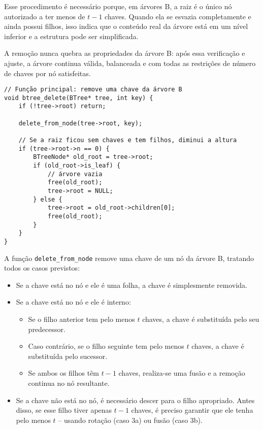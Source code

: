 Esse procedimento é necessário porque, em árvores B, a raiz é o único nó autorizado a ter menos de \( t - 1 \) chaves. 
Quando ela se esvazia completamente e ainda possui filhos, isso indica que o conteúdo real da árvore está em um nível inferior e a estrutura pode ser simplificada.

A remoção nunca quebra as propriedades da árvore B: após essa verificação e ajuste, a árvore continua válida, balanceada e com todas as restrições de número de chaves por nó satisfeitas.

\begin{lstlisting}
// Função principal: remove uma chave da árvore B
void btree_delete(BTree* tree, int key) {
    if (!tree->root) return;

    delete_from_node(tree->root, key);

    // Se a raiz ficou sem chaves e tem filhos, diminui a altura
    if (tree->root->n == 0) {
        BTreeNode* old_root = tree->root;
        if (old_root->is_leaf) {
            // árvore vazia
            free(old_root);
            tree->root = NULL;
        } else {
            tree->root = old_root->children[0];
            free(old_root);
        }
    }
}
\end{lstlisting}

A função \texttt{delete\_from\_node} remove uma chave de um nó da árvore B, tratando todos os casos previstos:

\begin{itemize}
  \item Se a chave está no nó e ele é uma folha, a chave é simplesmente removida.
  \item Se a chave está no nó e ele é interno:
    \begin{itemize}
      \item Se o filho anterior tem pelo menos \( t \) chaves, a chave é substituída pelo seu predecessor.
      \item Caso contrário, se o filho seguinte tem pelo menos \( t \) chaves, a chave é substituída pelo sucessor.
      \item Se ambos os filhos têm \( t - 1 \) chaves, realiza-se uma fusão e a remoção continua no nó resultante.
    \end{itemize}
  \item Se a chave não está no nó, é necessário descer para o filho apropriado. Antes disso, se esse filho tiver apenas \( t - 1 \) chaves, é preciso garantir que ele tenha pelo menos \( t \) -- usando rotação (caso 3a) ou fusão (caso 3b).
\end{itemize}

